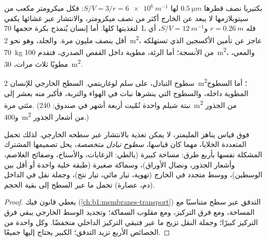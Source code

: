 \begin{example}\label{ex:b1:organism-environment:svnumbers}
بكتيريا نصف قطرها $\qty{0.5}{\micro m}$ لها
$S/V = 3/r = \qty{6e6}{m^{-1}}$: فكل ميكرومتر مكعب من سيتوبلازمها لا
يبعد عن الخارج أكثر من نصف ميكرومتر، والانتشار عبر غشائها يكفي
لتغذيتها كلها. أما إنسان يُنمذج بكرة حجمها \qty{70}{L} فله
$r = \qty{0.26}{m}$ و$S/V = \qty{12}{m^{-1}}$، أي أقل بنصف مليون
مرة. والجلد، وهو نحو \qty{2}{m^2}، عاجز عن تأمين الأكسجين الذي
تستهلكه \qty{70}{kg} من الأنسجة؛ أما الرئة، مطوية داخل القفص
الصدري، فتقدم \qty{100}{m^2}، والمعي، مطويًا ثلاث مرات،
\qty{30}{m^2}.
\end{example}

\begin{omfigure}

{\small سطوح التبادل، على سلم لوغاريتمي. السطح الخارجي للإنسان
\qty{2}{m^2}؛ أما السطوح المطوية داخله، والسطوح التي ينشرها نبات في
الهواء والتربة، فأكبر منه بعشر إلى مئتي مرة. (نبتة شيلم واحدة نُمّيت
أربعة أشهر في صندوق: \qty{240}{m^2} من الجذور و\qty{400}{m^2} من
أشعار الجذور.)}
\end{omfigure}

\begin{proposition}\label{prop:b1:organism-environment:surfaces}
فوق قياس يناهز المليمتر، لا يمكن تغذية  بالانتشار عبر سطحه
الخارجي. لذلك تحمل  المتعددة الخلايا، مهما كان قياسها،
\emph{سطوح تبادل متخصصة}، يحل تصميمها المشترك
المشكلة نفسها بأربع طرق: مساحة كبيرة (بالطي: الزغابات، والأسناخ،
وصفائح الغلاصم، وأشعار الجذور، ونصال الأوراق)، وسماكة صغيرة (طبقة
خلية واحدة أو أقل بين الوسطين)، ووسط متجدد في الخارج (تهوية، تيار
مائي، تيار نتح)، وجملة نقل في الداخل (دم، عصارة) تحمل ما عبر السطح
إلى بقية الحجم.
\end{proposition}
\begin{proof}
يعطي قانون فيك (\cref{ch:b1:membranes-transport}) التدفق عبر سطح
متناسبًا مع المساحة، ومع فرق التركيز، ومع مقلوب السماكة؛ وتجديد
الوسط الخارجي يبقي فرق التركيز كبيرًا؛ وجملة النقل تزيح ما عبر
فتبقي التركيز الداخلي منخفضًا. وكل واحدة من الخصائص الأربع تزيد
التدفق؛  الكبير يحتاج إليها جميعًا.
\end{proof}

